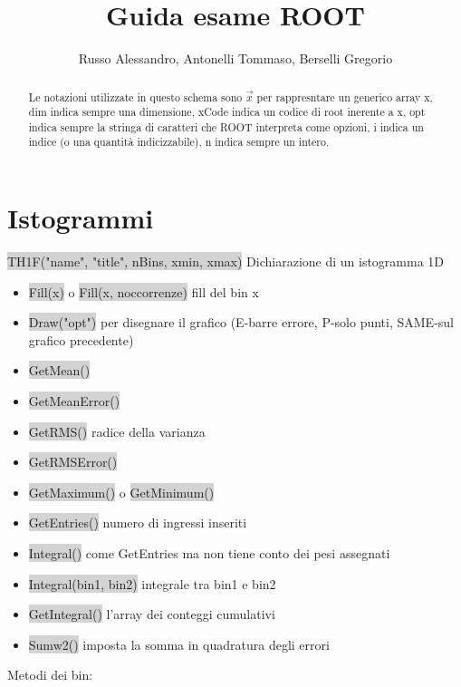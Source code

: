 \documentclass[a4paper]{article}
\begin{document}
	\title{Guida esame ROOT}
	\author{Russo Alessandro, Antonelli Tommaso, Berselli Gregorio}
    \maketitle
\begin{abstract}
    Le notazioni utilizzate in questo schema sono $\vec{x}$ per rappresntare un generico array x, dim indica sempre una dimensione, xCode indica un codice di root inerente a x, opt indica sempre la stringa di caratteri che ROOT interpreta come opzioni, i indica un indice (o una quantità indicizzabile), n indica sempre un intero.
\end{abstract}
\section{Istogrammi}
    \colorbox{LightGray}{TH1F("name", "title", nBins, xmin, xmax)} Dichiarazione di un istogramma 1D
    \begin{itemize}
        \item \colorbox{LightGray}{Fill(x)} o \colorbox{LightGray}{Fill(x, noccorrenze)} fill del bin x 
        \item \colorbox{LightGray}{Draw("opt")} per disegnare il grafico (E-barre errore, P-solo punti, SAME-sul grafico precedente)
        \item \colorbox{LightGray}{GetMean()}
        \item \colorbox{LightGray}{GetMeanError()}
        \item \colorbox{LightGray}{GetRMS()} radice della varianza
        \item \colorbox{LightGray}{GetRMSError()}
        \item \colorbox{LightGray}{GetMaximum()} o \colorbox{LightGray}{GetMinimum()}
        \item \colorbox{LightGray}{GetEntries()} numero di ingressi inseriti
        \item \colorbox{LightGray}{Integral()} come GetEntries ma non tiene conto dei pesi assegnati
        \item \colorbox{LightGray}{Integral(bin1, bin2)} integrale tra bin1 e bin2
        \item \colorbox{LightGray}{GetIntegral()} l'array dei conteggi cumulativi
        \item \colorbox{LightGray}{Sumw2()} imposta la somma in quadratura degli errori
    \end{itemize}
    Metodi dei bin:
\end{document}
